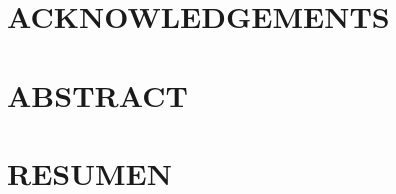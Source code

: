 \documentclass[pdftex]{pucthesis}	%
\begin{document}


 \label{acknowledgements} %
\chapter*{ACKNOWLEDGEMENTS}           


\cleardoublepage



\tableofcontents
{} \label{listoffigures}
\listoffigures
{} \label{listoftables}
\listoftables
\cleardoublepage



 \label{abstract}
\chapter*{ABSTRACT}

\cleardoublepage

 \label{resumen}
\chapter*{RESUMEN}

\cleardoublepage




\topmargin -25mm
\headheight 20mm
\headsep 20mm
\oddsidemargin 15mm
\end{document}
